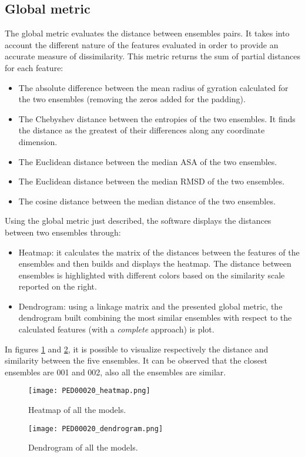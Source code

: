 \subsection{Global metric}
The global metric evaluates the distance between ensembles pairs. It takes into account the different nature of the features evaluated in order to provide an accurate measure of dissimilarity.
This metric returns the sum of partial distances for each feature:
\begin{itemize}
\item The absolute difference between the mean radius of gyration calculated for the two ensembles (removing the zeros added for the padding).
\item The Chebyshev distance between the entropies of the two ensembles. It finds the distance as the greatest of their differences along any coordinate dimension.
\item The Euclidean distance between the median ASA of the two ensembles.
\item The Euclidean distance between the median RMSD of the two ensembles.
\item The cosine distance between the median distance of the two ensembles.
\end{itemize}


Using the global metric just described, the software displays the distances between two ensembles through:
\begin{itemize}
\item Heatmap: it calculates the matrix of the distances between the features of the ensembles and then builds and displays the heatmap. The distance between ensembles is highlighted with different colors based on the similarity scale reported on the right. 
\item Dendrogram: using a linkage matrix and the presented global metric, the dendrogram built combining the most similar ensembles with respect to the calculated features (with a \emph{complete} approach) is plot.
\end{itemize}

In figures \ref{heatmap} and \ref{dendrogram}, it is possible to visualize respectively the distance and similarity between the five ensembles. It can be observed that the closest ensembles are 001 and 002, also all the ensembles are similar.

\begin{figure}[H]
	\begin{minipage}[b]{0.93\textwidth}
		\centering
		\texttt{[image: PED00020\_heatmap.png]}
		\caption{Heatmap of all the models.}
		\label{heatmap}
	\end{minipage}
\end{figure}
\begin{figure}[H]
	\begin{minipage}[b]{0.93\textwidth}
		\centering
		\texttt{[image: PED00020\_dendrogram.png]}
		\caption{Dendrogram of all the models.}
		\label{dendrogram}
	\end{minipage}
\end{figure}


